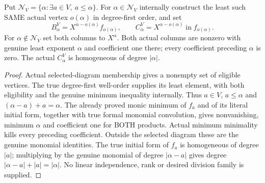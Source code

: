 \begin{lemma}
\label{hir:actual-selected-vertex-owned-columns}
Put $\mathcal N_V=\{\alpha:\exists a\in V,\ a\le\alpha\}$.
For $\alpha\in\mathcal N_V$ internally construct the least such SAME
actual vertex $o(\alpha)$ in degree-first order, and set
\[
 B^V_\alpha=X^{\alpha-o(\alpha)}f_{o(\alpha)},\qquad
 C^V_\alpha=X^{\alpha-o(\alpha)}\operatorname{in}f_{o(\alpha)}.
\]
For $\alpha\notin\mathcal N_V$ set both columns to $X^\alpha$.
Both actual columns are nonzero with genuine least exponent $\alpha$
and coefficient one there; every coefficient preceding $\alpha$ is zero.
The actual $C^V_\alpha$ is homogeneous of degree $|\alpha|$.
\leanok
\end{lemma}
\begin{proof}
Actual selected-diagram membership gives a nonempty set of eligible
vertices. The true degree-first well-order supplies its least element,
with both eligibility and the genuine minimum inequality internally.
Thus $a\in V$, $a\le\alpha$ and $(\alpha-a)+a=\alpha$. The already proved
monic minimum of $f_a$ and of its literal initial form, together with
true formal monomial convolution, gives nonvanishing, minimum $\alpha$
and coefficient one for BOTH products. Actual minimum minimality kills
every preceding coefficient. Outside the selected diagram these are
the genuine monomial identities. The true initial form of $f_a$ is
homogeneous of degree $|a|$; multiplying by the genuine monomial of
degree $|\alpha-a|$ gives degree $|\alpha-a|+|a|=|\alpha|$.
No linear independence, rank or desired division family is supplied.
\end{proof}

